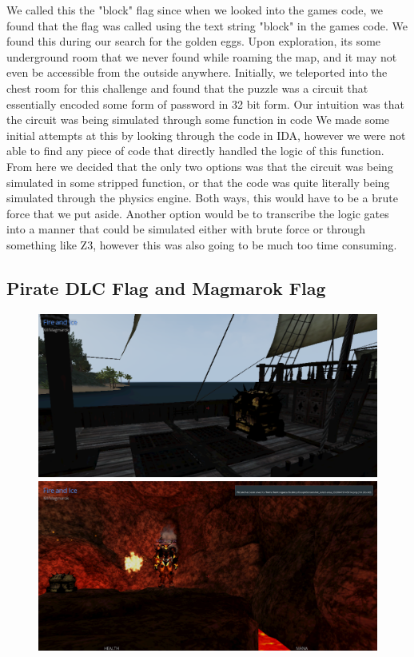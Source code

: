 \documentclass[11pt]{article}
\begin{document}
We called this the "block" flag since when we looked into the games code, we found that the flag was called using the text string "block" in the games code. We found this during our search for the golden eggs. Upon exploration, its some underground room that we never found while roaming the map, and it may not even be accessible from the outside anywhere. Initially, we teleported into the chest room for this challenge and found that the puzzle was a circuit that essentially encoded some form of password in 32 bit form. Our intuition was that the circuit was being simulated through some function in code We made some initial attempts at this by looking through the code in IDA, however we were not able to find any piece of code that directly handled the logic of this function. From here we decided that the only two options was that the circuit was being simulated in some stripped function, or that the code was quite literally being simulated through the physics engine. Both ways, this would have to be a brute force that we put aside. Another option would be to transcribe the logic gates into a manner that could be simulated either with brute force or through something like Z3, however this was also going to be much too time consuming.

\subsection*{Pirate DLC Flag and Magmarok Flag}

\begin{figure}[H]
    \centering
    \includegraphics[width=1.00\linewidth]{pirate.png}
    \includegraphics[width=1.00\linewidth]{magmarok.png}
\end{figure}
\end{document}
